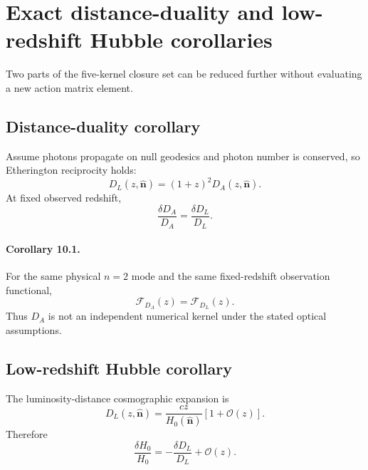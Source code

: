 \section{Exact distance-duality and low-redshift Hubble corollaries}
\label{sec:distance-duality-lowz}

Two parts of the five-kernel closure set can be reduced further without
evaluating a new action matrix element.

\subsection{Distance-duality corollary}

Assume photons propagate on null geodesics and photon number is conserved, so
Etherington reciprocity holds:
\begin{equation}
D_L(z,\hat{\mathbf n})
=
(1+z)^2 D_A(z,\hat{\mathbf n}).
\end{equation}
At fixed observed redshift,
\begin{equation}
\boxed{
\frac{\delta D_A}{D_A}
=
\frac{\delta D_L}{D_L}.
}
\label{eq:fractional-distance-duality}
\end{equation}

\paragraph{Corollary 10.1.}
For the same physical $n=2$ mode and the same fixed-redshift observation
functional,
\begin{equation}
\boxed{
\mathcal F_{D_A}(z)
=
\mathcal F_{D_L}(z).
}
\label{eq:FDA-equals-FDL}
\end{equation}
Thus $D_A$ is not an independent numerical kernel under the stated optical
assumptions.

\subsection{Low-redshift Hubble corollary}

The luminosity-distance cosmographic expansion is
\begin{equation}
D_L(z,\hat{\mathbf n})
=
\frac{cz}{H_0(\hat{\mathbf n})}
\left[
1+\mathcal O(z)
\right].
\end{equation}
Therefore
\begin{equation}
\boxed{
\frac{\delta H_0}{H_0}
=
-
\frac{\delta D_L}{D_L}
+
\mathcal O(z).
}
\label{eq:lowz-hubble-distance}
\end{equation}

